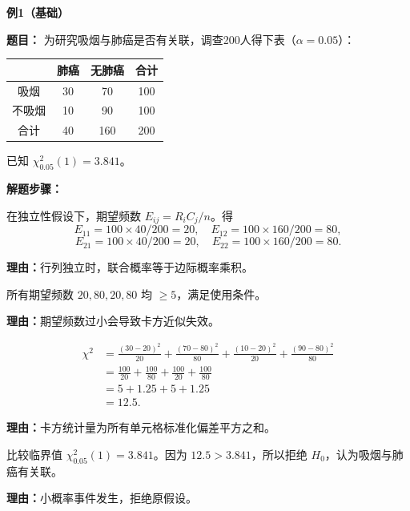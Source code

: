 \begin{examplebox}
	\textbf{\textcolor{CExample}{例1（基础）}}

	\textbf{\textcolor{CExample}{题目：}}
	为研究吸烟与肺癌是否有关联，调查200人得下表（$\alpha=0.05$）：

	\begin{center}
		\begin{tabular}{c|cc|c}
			& 肺癌 & 无肺癌 & 合计 \\ \hline
			吸烟 & 30 & 70 & 100 \\
			不吸烟 & 10 & 90 & 100 \\ \hline
			合计 & 40 & 160 & 200
		\end{tabular}
	\end{center}
	已知 $\chi^2_{0.05}(1)=3.841$。

	\textbf{\textcolor{CExample}{解题步骤：}}
	\begin{description}[style=nextline, leftmargin=2.8em, labelsep=0.5em, itemsep=0.45em]
		\item[\textbf{第一步（计算期望）：}]
			在独立性假设下，期望频数 $E_{ij}=R_iC_j/n$。得
			\[
				E_{11}=100\times40/200=20,\quad E_{12}=100\times160/200=80,
			\]
			\[
				E_{21}=100\times40/200=20,\quad E_{22}=100\times160/200=80.
			\]
			\par\textbf{理由：}行列独立时，联合概率等于边际概率乘积。
		\item[\textbf{第二步（检查条件）：}]
			所有期望频数 $20,80,20,80$ 均 $\geq 5$，满足使用条件。
			\par\textbf{理由：}期望频数过小会导致卡方近似失效。
		\item[\textbf{第三步（计算统计量）：}]
			\[
				\begin{aligned}
					\chi^2 &= \frac{(30-20)^2}{20}+\frac{(70-80)^2}{80}+\frac{(10-20)^2}{20}+\frac{(90-80)^2}{80} \\
					&= \frac{100}{20}+\frac{100}{80}+\frac{100}{20}+\frac{100}{80} \\
					&= 5+1.25+5+1.25 \\
					&= 12.5.
			\end{aligned}
			\]
			\par\textbf{理由：}卡方统计量为所有单元格标准化偏差平方之和。
		\item[\textbf{第四步（假设检验决策）：}]
			比较临界值 $\chi^2_{0.05}(1)=3.841$。因为 $12.5>3.841$，所以拒绝 $H_0$，认为吸烟与肺癌有关联。
			\par\textbf{理由：}小概率事件发生，拒绝原假设。
	\end{description}


\end{examplebox}
